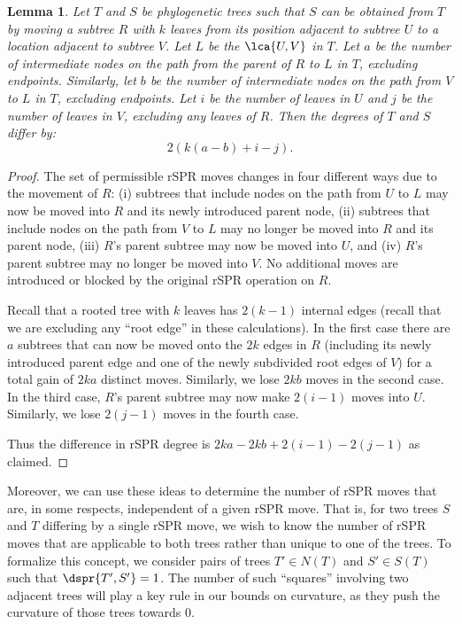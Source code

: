 \documentclass[11pt,onecolumn,conference]{IEEEtran}
\newtheorem{lemma}[theorem]{Lemma}
\begin{document}
\begin{lemma}
\label{lem:degree_change}
Let $T$ and $S$ be phylogenetic trees such that $S$ can be obtained from $T$ by moving a subtree $R$ with $k$ leaves from its position adjacent to subtree $U$ to a location adjacent to subtree $V$.
Let $L$ be the $\lca{U,V}$ in $T$.
Let $a$ be the number of intermediate nodes on the path from the parent of $R$ to $L$ in $T$, excluding endpoints.
Similarly, let $b$ be the number of intermediate nodes on the path from $V$ to $L$ in $T$, excluding endpoints.
Let $i$ be the number of leaves in $U$ and $j$ be the number of leaves in $V$, excluding any leaves of $R$.
Then the degrees of $T$ and $S$ differ by:
$$2\left(k(a-b) + i - j\right).$$

\end{lemma}
\begin{proof}
The set of permissible rSPR moves changes in four different ways due to the movement of $R$:
(i) subtrees that include nodes on the path from $U$ to $L$ may now be moved into $R$ and its newly introduced parent node,
(ii) subtrees that include nodes on the path from $V$ to $L$ may no longer be moved into $R$ and its parent node,
(iii) $R$'s parent subtree may now be moved into $U$, and
(iv) $R$'s parent subtree may no longer be moved into $V$.
No additional moves are introduced or blocked by the original rSPR operation on $R$.

Recall that a rooted tree with $k$ leaves has $2(k-1)$ internal edges (recall that we are excluding any ``root edge'' in these calculations).
In the first case there are $a$ subtrees that can now be moved onto the $2k$ edges in $R$ (including its newly introduced parent edge and one of the newly subdivided root edges of $V$) for a total gain of $2ka$ distinct moves.
Similarly, we lose $2kb$ moves in the second case.
In the third case, $R$'s parent subtree may now make $2(i-1)$ moves into $U$.
Similarly, we lose $2(j-1)$ moves in the fourth case.

Thus the difference in rSPR degree is $2ka - 2kb + 2(i-1) - 2(j-1)$ as claimed.
\end{proof}

Moreover, we can use these ideas to determine the number of rSPR moves that are, in some respects, independent of a given rSPR move.
That is, for two trees $S$ and $T$ differing by a single rSPR move, we wish to know the number of rSPR moves that are applicable to both trees rather than unique to one of the trees.
To formalize this concept, we consider pairs of trees $T' \in N(T)$ and $S' \in S(T)$ such that $\dspr{T',S'} = 1$.
The number of such ``squares'' involving two adjacent trees will play a key rule in our bounds on curvature, as they push the curvature of those trees towards 0.
\end{document}
